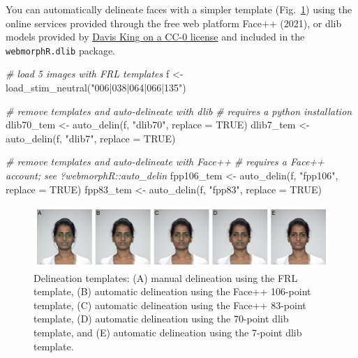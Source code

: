 \documentclass[
  doc,floatsintext]{apa6}
\newenvironment{Shaded}{\begin{snugshade}}{\end{snugshade}}
\newcommand{\AttributeTok}[1]{\textcolor[rgb]{0.77,0.63,0.00}{#1}}
\newcommand{\CommentTok}[1]{\textcolor[rgb]{0.56,0.35,0.01}{\textit{#1}}}
\newcommand{\ConstantTok}[1]{\textcolor[rgb]{0.00,0.00,0.00}{#1}}
\newcommand{\FunctionTok}[1]{\textcolor[rgb]{0.00,0.00,0.00}{#1}}
\newcommand{\NormalTok}[1]{#1}
\newcommand{\OtherTok}[1]{\textcolor[rgb]{0.56,0.35,0.01}{#1}}
\newcommand{\StringTok}[1]{\textcolor[rgb]{0.31,0.60,0.02}{#1}}
\begin{document}
You can automatically delineate faces with a simpler template (Fig.~\ref{fig:auto-delin}) using the online services provided through the free web platform Face++ (2021), or dlib models provided by \href{https://github.com/davisking/dlib-models}{Davis King on a CC-0 license} and included in the \texttt{webmorphR.dlib} package.

\begin{Shaded}
\begin{Highlighting}[]
\CommentTok{\# load 5 images with FRL templates}
\NormalTok{f }\OtherTok{\textless{}{-}} \FunctionTok{load\_stim\_neutral}\NormalTok{(}\StringTok{"006|038|064|066|135"}\NormalTok{)}

\CommentTok{\# remove templates and auto{-}delineate with dlib}
\CommentTok{\# requires a python installation}
\NormalTok{dlib70\_tem }\OtherTok{\textless{}{-}} \FunctionTok{auto\_delin}\NormalTok{(f, }\StringTok{"dlib70"}\NormalTok{, }\AttributeTok{replace =} \ConstantTok{TRUE}\NormalTok{)}
\NormalTok{dlib7\_tem }\OtherTok{\textless{}{-}} \FunctionTok{auto\_delin}\NormalTok{(f, }\StringTok{"dlib7"}\NormalTok{, }\AttributeTok{replace =} \ConstantTok{TRUE}\NormalTok{)}

\CommentTok{\# remove templates and auto{-}delineate with Face++}
\CommentTok{\# requires a Face++ account; see ?webmorphR::auto\_delin}
\NormalTok{fpp106\_tem }\OtherTok{\textless{}{-}} \FunctionTok{auto\_delin}\NormalTok{(f, }\StringTok{"fpp106"}\NormalTok{, }\AttributeTok{replace =} \ConstantTok{TRUE}\NormalTok{)}
\NormalTok{fpp83\_tem }\OtherTok{\textless{}{-}} \FunctionTok{auto\_delin}\NormalTok{(f, }\StringTok{"fpp83"}\NormalTok{, }\AttributeTok{replace =} \ConstantTok{TRUE}\NormalTok{)}
\end{Highlighting}
\end{Shaded}

\begin{figure}
\includegraphics[width=1\linewidth]{index_files/figure-latex/auto-delin-1} \caption{Delineation templates: (A) manual delineation using the FRL template, (B) automatic delineation using the Face++ 106-point template, (C) automatic delineation using the Face++ 83-point template, (D) automatic delineation using the 70-point dlib template, and (E) automatic delineation using the 7-point dlib template.}\label{fig:auto-delin}
\end{figure}
\end{document}
